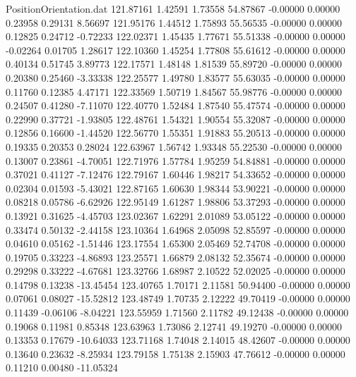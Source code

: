 \begin{filecontents}{PositionOrientation.dat}
 121.87161    1.42591    1.73558    54.87867   -0.00000    0.00000    0.23958    0.29131    8.56697
 121.95176    1.44512    1.75893    55.56535   -0.00000    0.00000    0.12825    0.24712   -0.72233
 122.02371    1.45435    1.77671    55.51338   -0.00000    0.00000   -0.02264    0.01705    1.28617
 122.10360    1.45254    1.77808    55.61612   -0.00000    0.00000    0.40134    0.51745    3.89773
 122.17571    1.48148    1.81539    55.89720   -0.00000    0.00000    0.20380    0.25460   -3.33338
 122.25577    1.49780    1.83577    55.63035   -0.00000    0.00000    0.11760    0.12385    4.47171
 122.33569    1.50719    1.84567    55.98776   -0.00000    0.00000    0.24507    0.41280   -7.11070
 122.40770    1.52484    1.87540    55.47574   -0.00000    0.00000    0.22990    0.37721   -1.93805
 122.48761    1.54321    1.90554    55.32087   -0.00000    0.00000    0.12856    0.16600   -1.44520
 122.56770    1.55351    1.91883    55.20513   -0.00000    0.00000    0.19335    0.20353    0.28024
 122.63967    1.56742    1.93348    55.22530   -0.00000    0.00000    0.13007    0.23861   -4.70051
 122.71976    1.57784    1.95259    54.84881   -0.00000    0.00000    0.37021    0.41127   -7.12476
 122.79167    1.60446    1.98217    54.33652   -0.00000    0.00000    0.02304    0.01593   -5.43021
 122.87165    1.60630    1.98344    53.90221   -0.00000    0.00000    0.08218    0.05786   -6.62926
 122.95149    1.61287    1.98806    53.37293   -0.00000    0.00000    0.13921    0.31625   -4.45703
 123.02367    1.62291    2.01089    53.05122   -0.00000    0.00000    0.33474    0.50132   -2.44158
 123.10364    1.64968    2.05098    52.85597   -0.00000    0.00000    0.04610    0.05162   -1.51446
 123.17554    1.65300    2.05469    52.74708   -0.00000    0.00000    0.19705    0.33223   -4.86893
 123.25571    1.66879    2.08132    52.35674   -0.00000    0.00000    0.29298    0.33222   -4.67681
 123.32766    1.68987    2.10522    52.02025   -0.00000    0.00000    0.14798    0.13238  -13.45454
 123.40765    1.70171    2.11581    50.94400   -0.00000    0.00000    0.07061    0.08027  -15.52812
 123.48749    1.70735    2.12222    49.70419   -0.00000    0.00000    0.11439   -0.06106   -8.04221
 123.55959    1.71560    2.11782    49.12438   -0.00000    0.00000    0.19068    0.11981    0.85348
 123.63963    1.73086    2.12741    49.19270   -0.00000    0.00000    0.13353    0.17679  -10.64033
 123.71168    1.74048    2.14015    48.42607   -0.00000    0.00000    0.13640    0.23632   -8.25934
 123.79158    1.75138    2.15903    47.76612   -0.00000    0.00000    0.11210    0.00480  -11.05324

\end{filecontents}

